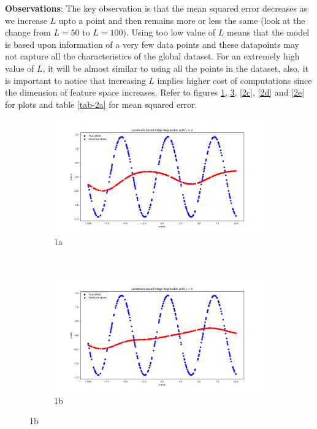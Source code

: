 \documentclass[a4paper,11pt]{article}
\begin{document}
\begin{mlsolution}
\textbf{Observations}: The key observation is that the mean squared error decreases as we increase $L$ upto a point and then remains more or less the same  (look at the change from $L = 50$ to $L = 100$). Using too low value of $L$ means that the model is based upon information of a very few data points and these datapoints may not capture all the characteristics of the global dataset. For an extremely high value of $L$, it will be almost similar to using all the points in the dataset, also, it is important to notice that increasing $L$ implies higher cost of computations since the dimension of feature space increases. Refer to figures \ref{2a}, \ref{2b}, \ref{2c}, \ref{2d} and \ref{2e} for plots and table \ref{tab-2a} for mean squared error.
\begin{figure}[!htbp]
	\begin{subfigure}{0.5\textwidth}
		\centering
		\includegraphics[width=1.8\textwidth]{images/lrr_L2.png}
		\caption{1a}
		\label{2a}
	\end{subfigure}
	\\
	\begin{subfigure}{0.5\textwidth}
		\centering
		\includegraphics[width=1.8\textwidth]{images/lrr_L5.png}
		\caption{1b}
		\label{2b}
	\end{subfigure}
\end{figure}


\end{mlsolution}
\end{document}
